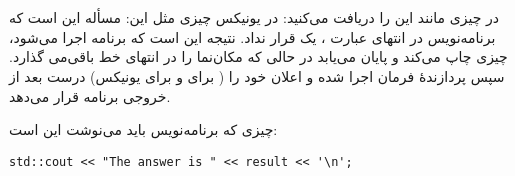\section{}
\paragraph{}\label{answer:43}
در  چیزی مانند این را دریافت می‌کنید:
\LTR\noindent
{}
\RTL
در یونیکس چیزی مثل این:
\LTR\noindent
{}
\RTL
مسأله این است که برنامه‌نویس در انتهای عبارت ، یک  قرار نداد. نتیجه این است که برنامه اجرا می‌شود، چیزی چاپ می‌کند و پایان می‌یابد در حالی که مکان‌نما را در انتهای خط باقی‌می گذارد. سپس پردازندهٔ فرمان اجرا شده و اعلان خود را ( برای  و \lr{\texttt{\$}} برای یونیکس) درست بعد از خروجی برنامه قرار می‌دهد.

چیزی که برنامه‌نویس باید می‌نوشت این است:
\begin{LTR}
    \begin{lstlisting}[style=C++Style]
        std::cout << "The answer is " << result << '\n';
    \end{lstlisting}
\end{LTR}
